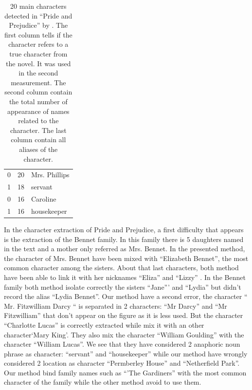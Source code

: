 \documentclass[a4paper, 12pt]{report}
\begin{document}
\begin{table}[]
{\begin{tabular}{|l|l|l|}
0             & 20       & Mrs. Phillips                                                                            \\
1             & 18       & servant                                                                                 \\
0             & 16       & Caroline                                                                                  \\
1             & 16       & housekeeper                                                                    \\
\hline
\end{tabular}}
\caption{20 main characters detected in ``Pride and Prejudice'' by \cite{character_meta}. 
The first column tells if the character refers to a true character from the novel. It was used in the second measurement. 
The second column contain the total number of appearance of names related to the character. The last column contain all aliases of the character. }

\end{table}

In the character extraction of Pride and Prejudice, a first difficulty that appears is the extraction of the Bennet family. 
In this family there is 5 daughters named in the text and a mother only referred as Mrs. Bennet. 
In the presented method, the character of Mrs. Bennet have been mixed with ``Elizabeth Bennet'', the most common character among the sisters. About that last characters, 
both method have been able to link it with her nicknames ``Eliza'' and ``Lizzy'' . In the Bennet family both method isolate correctly the sisters ``Jane''' and ``Lydia'' 
but \cite{character_meta} didn't record the alias ``Lydia Bennet''. 
Our method have a second error, the character `` Mr. Fitzwilliam Darcy `` is separated in 2 characters: ``Mr Darcy'' and ``Mr Fitzwilliam'' that don't appear on the figure 
as it is less used. But the character ``Charlotte Lucas'' is correctly extracted while \cite{character_meta} mix it with an other character`Mary King'. 
They also mix the character ``William Goulding'' with the character ``William Lucas''. 
We see that they have considered 2 anaphoric noun phrase as character: ``servant'' and ``housekeeper'' 
while our method have wrongly considered 2 location as character ``Permberley House'' and ``Netherfield Park''. 
Our method bind family names such as ``'The Gardiners'' with the most common character of the family while the other method avoid to use them.\\
\end{document}
